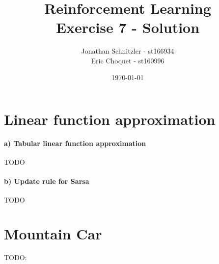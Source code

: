 \documentclass{article}
\title{Reinforcement Learning \\ Exercise 7 - Solution}
\author{Jonathan Schnitzler - st166934 \\
Eric Choquet - st160996}
\date{\today}
\begin{document}
\maketitle

\section{Linear function approximation}

\paragraph*{a)  Tabular linear function approximation}

TODO


\paragraph*{b) Update rule for Sarsa}

TODO



\section{Mountain Car}

\begin{comment}
\begin{figure}[H]
\centering
\texttt{[image: images/terminal.png]}
\caption{Output for Trees with \texttt{maxiter} = [10, 20, 50, 100, 200, 500]}
\label{fig:terminal}
\end{figure}
\end{comment}
TODO:
\end{document}
